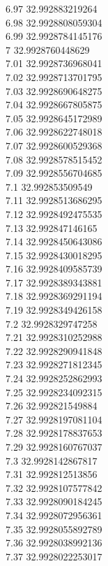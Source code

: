 {6.97	32.992883219264\\
6.98	32.9928808059304\\
6.99	32.9928784145176\\
7	32.9928760448629\\
7.01	32.9928736968041\\
7.02	32.9928713701795\\
7.03	32.9928690648275\\
7.04	32.9928667805875\\
7.05	32.9928645172989\\
7.06	32.9928622748018\\
7.07	32.9928600529368\\
7.08	32.9928578515452\\
7.09	32.9928556704685\\
7.1	32.992853509549\\
7.11	32.9928513686295\\
7.12	32.9928492475535\\
7.13	32.992847146165\\
7.14	32.9928450643086\\
7.15	32.9928430018295\\
7.16	32.9928409585739\\
7.17	32.9928389343881\\
7.18	32.9928369291194\\
7.19	32.9928349426158\\
7.2	32.9928329747258\\
7.21	32.9928310252988\\
7.22	32.9928290941848\\
7.23	32.9928271812345\\
7.24	32.9928252862993\\
7.25	32.9928234092315\\
7.26	32.992821549884\\
7.27	32.9928197081104\\
7.28	32.9928178837653\\
7.29	32.9928160767037\\
7.3	32.9928142867817\\
7.31	32.992812513856\\
7.32	32.9928107577842\\
7.33	32.9928090184245\\
7.34	32.9928072956361\\
7.35	32.9928055892789\\
7.36	32.9928038992136\\
7.37	32.9928022253017\\
}

